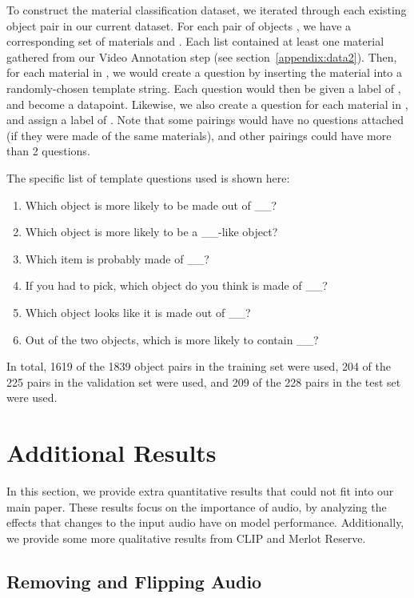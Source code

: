 \documentclass[runningheads]{llncs}
\begin{document}
To construct the material classification dataset, we iterated through each existing object pair in our current dataset. For each pair of objects , we have a corresponding set of materials  and . Each list contained at least one material gathered from our Video Annotation step (see section~\ref{appendix:data2}). Then, for each material in , we would create a question by inserting the material into a randomly-chosen template string. Each question would then be given a label of , and become a datapoint. Likewise, we also create a question for each material in , and assign a label of . Note that some pairings would have no questions attached (if they were made of the same materials), and other pairings could have more than 2 questions. 

The specific list of template questions used is shown here:
\begin{enumerate}
    \item Which object is more likely to be made out of \_\_?
    \item Which object is more likely to be a \_\_-like object?
    \item Which item is probably made of \_\_?
    \item If you had to pick, which object do you think is made of \_\_?
    \item Which object looks like it is made out of \_\_?
    \item Out of the two objects, which is more likely to contain \_\_?
\end{enumerate}

In total, 1619 of the 1839 object pairs in the training set were used, 204 of the 225 pairs in the validation set were used, and 209 of the 228 pairs in the test set were used. 

\section{Additional Results}\label{appendix:results}

In this section, we provide extra quantitative results that could not fit into our main paper. These results focus on the importance of audio, by analyzing the effects that changes to the input audio have on model performance. Additionally, we provide some more qualitative results from CLIP and Merlot Reserve. 


\subsection{Removing and Flipping Audio}
\end{document}
